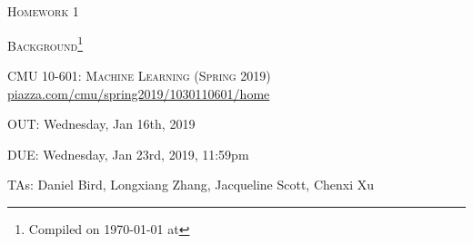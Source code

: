 \documentclass[12pt]{article}
\begin{document}
\section*{}
\begin{center}
  \centerline{\textsc{\LARGE  Homework 1}}
  \vspace{0.5em}
  \centerline{\textsc{\LARGE Background}\footnote{Compiled on \today{} at \currenttime{}}}
  \vspace{1em}
  \textsc{\large CMU 10-601: Machine Learning (Spring 2019)} \\
  \vspace{0.5em}
  \url{piazza.com/cmu/spring2019/1030110601/home} \\
  \vspace{0.5em}
  \centerline{OUT: Wednesday, Jan 16th, 2019}
  \vspace{0.5em}
  \centerline{DUE: Wednesday, Jan 23rd, 2019, 11:59pm}
    \centerline{TAs: Daniel Bird, Longxiang Zhang, Jacqueline Scott, Chenxi Xu}
\end{center}
\end{document}
